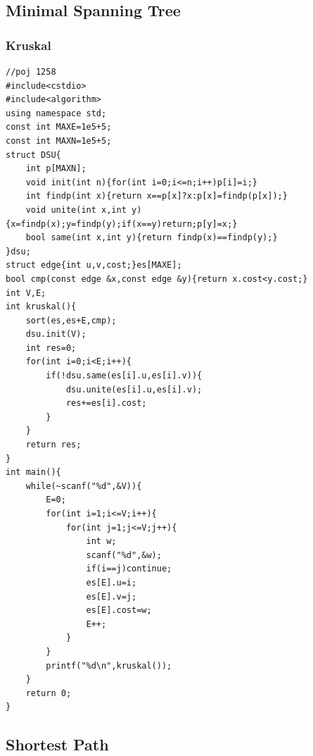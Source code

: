 \documentclass[twoside]{article}
\begin{document}
\subsection{Minimal Spanning Tree}
\subsubsection{Kruskal}
\begin{lstlisting}
//poj 1258
#include<cstdio>
#include<algorithm>
using namespace std;
const int MAXE=1e5+5;
const int MAXN=1e5+5;
struct DSU{
    int p[MAXN];
    void init(int n){for(int i=0;i<=n;i++)p[i]=i;}
    int findp(int x){return x==p[x]?x:p[x]=findp(p[x]);}
    void unite(int x,int y){x=findp(x);y=findp(y);if(x==y)return;p[y]=x;}
    bool same(int x,int y){return findp(x)==findp(y);}
}dsu;
struct edge{int u,v,cost;}es[MAXE];
bool cmp(const edge &x,const edge &y){return x.cost<y.cost;}
int V,E;
int kruskal(){
    sort(es,es+E,cmp);
    dsu.init(V);
    int res=0;
    for(int i=0;i<E;i++){
        if(!dsu.same(es[i].u,es[i].v)){
            dsu.unite(es[i].u,es[i].v);
            res+=es[i].cost;
        }
    }
    return res;
}
int main(){
    while(~scanf("%d",&V)){
        E=0;
        for(int i=1;i<=V;i++){
            for(int j=1;j<=V;j++){
                int w;
                scanf("%d",&w);
                if(i==j)continue;
                es[E].u=i;
                es[E].v=j;
                es[E].cost=w;
                E++;
            }
        }
        printf("%d\n",kruskal());
    }
    return 0;
}
\end{lstlisting}
\subsection{Shortest Path}
\end{document}
